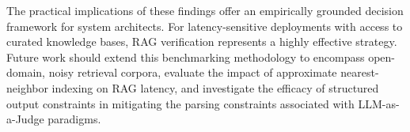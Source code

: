 \documentclass[conference]{IEEEtran}
\begin{document}
The practical implications of these findings offer an empirically grounded decision framework for system architects. For latency-sensitive deployments with access to curated knowledge bases, RAG verification represents a highly effective strategy. Future work should extend this benchmarking methodology to encompass open-domain, noisy retrieval corpora, evaluate the impact of approximate nearest-neighbor indexing on RAG latency, and investigate the efficacy of structured output constraints in mitigating the parsing constraints associated with LLM-as-a-Judge paradigms.

\clearpage




\end{document}
